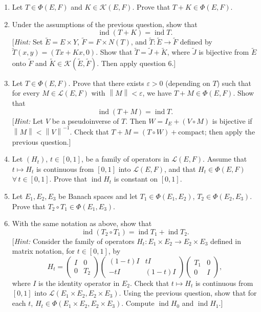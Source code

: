\documentclass[12pt]{article}
\newcommand{\norm}[1]{\left\|#1\right\|}
\begin{document}
\begin{enumerate}
 
\item Let $T \in \Phi(E,F)$ and $K \in \mathcal{K}(E,F)$. Prove that $T + K \in \Phi(E,F)$.
 
\item Under the assumptions of the previous question, show that
\[
\operatorname{ind}(T + K) = \operatorname{ind} T.
\]
[\textit{Hint:} Set $\tilde{E} = E \times Y$, $\tilde{F} = F \times N(T)$, and $\tilde{T} : \tilde{E} \to \tilde{F}$ defined
by $\tilde{T}(x,y) = (Tx + Kx, 0)$. Show that $\tilde{T} = \tilde{J} + \tilde{K}$, where $\tilde{J}$ is
bijective from $\tilde{E}$ onto $\tilde{F}$ and $\tilde{K} \in \mathcal{K}(\tilde{E},\tilde{F})$. Then apply question 6.]
 
\item Let $T \in \Phi(E,F)$. Prove that there exists $\varepsilon > 0$ (depending on $T$) such that for
every $M \in \mathcal{L}(E,F)$ with $\norm{M} < \varepsilon$, we have $T + M \in \Phi(E,F)$. Show that
\[
\operatorname{ind}(T + M) = \operatorname{ind} T.
\]
[\textit{Hint:} Let $V$ be a pseudoinverse of $T$. Then $W = I_E + (V \circ M)$ is bijective
if $\norm{M} < \norm{V}^{-1}$. Check that $T + M = (T \circ W) + \text{compact}$; then apply the
previous question.]
 
\item Let $(H_t)$, $t \in [0,1]$, be a family of operators in $\mathcal{L}(E,F)$. Assume that
$t \mapsto H_t$ is continuous from $[0,1]$ into $\mathcal{L}(E,F)$, and that $H_t \in \Phi(E,F)$
$\forall\, t \in [0,1]$. Prove that $\operatorname{ind} H_t$ is constant on $[0,1]$.
 
\item Let $E_1, E_2, E_3$ be Banach spaces and let $T_1 \in \Phi(E_1,E_2)$, $T_2 \in \Phi(E_2,E_3)$.
Prove that $T_2 \circ T_1 \in \Phi(E_1,E_3)$.
 
\item With the same notation as above, show that
\[
\operatorname{ind}(T_2 \circ T_1) = \operatorname{ind} T_1 + \operatorname{ind} T_2.
\]
[\textit{Hint:} Consider the family of operators $H_t : E_1 \times E_2 \to E_2 \times E_3$ defined
in matrix notation, for $t \in [0,1]$, by
\[
H_t =
\begin{pmatrix} I & 0 \\ 0 & T_2 \end{pmatrix}
\begin{pmatrix} (1-t)I & tI \\ -tI & (1-t)I \end{pmatrix}
\begin{pmatrix} T_1 & 0 \\ 0 & I \end{pmatrix},
\]
where $I$ is the identity operator in $E_2$. Check that $t \mapsto H_t$ is continuous
from $[0,1]$ into $\mathcal{L}(E_1 \times E_2, E_2 \times E_3)$. Using the previous question, show
that for each $t$, $H_t \in \Phi(E_1 \times E_2, E_2 \times E_3)$. Compute $\operatorname{ind} H_0$ and $\operatorname{ind} H_1$.]
 

\end{enumerate}
\end{document}

